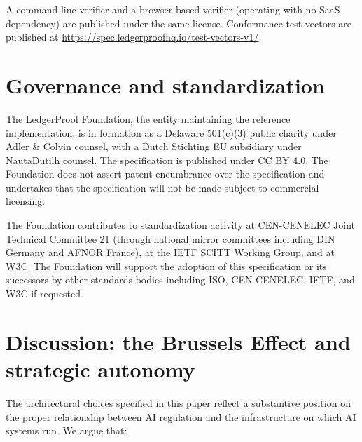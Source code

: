 \documentclass[11pt,a4paper]{article}
\begin{document}
A command-line verifier and a browser-based verifier (operating with no SaaS dependency) are published under the same license. Conformance test vectors are published at \url{https://spec.ledgerproofhq.io/test-vectors-v1/}.

\section{Governance and standardization}

The LedgerProof Foundation, the entity maintaining the reference implementation, is in formation as a Delaware 501(c)(3) public charity under Adler \& Colvin counsel, with a Dutch Stichting EU subsidiary under NautaDutilh counsel. The specification is published under CC BY 4.0. The Foundation does not assert patent encumbrance over the specification and undertakes that the specification will not be made subject to commercial licensing.

The Foundation contributes to standardization activity at CEN-CENELEC Joint Technical Committee 21 (through national mirror committees including DIN Germany and AFNOR France), at the IETF SCITT Working Group, and at W3C. The Foundation will support the adoption of this specification or its successors by other standards bodies including ISO, CEN-CENELEC, IETF, and W3C if requested.

\section{Discussion: the Brussels Effect and strategic autonomy}

The architectural choices specified in this paper reflect a substantive position on the proper relationship between AI regulation and the infrastructure on which AI systems run. We argue that:
\end{document}
